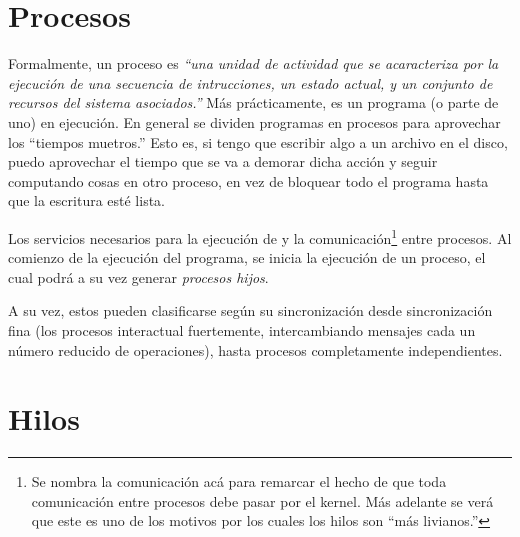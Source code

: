 \section{Procesos}
Formalmente, un proceso es \textit{``una unidad de actividad que se acaracteriza por la ejecución de una secuencia de intrucciones, un estado actual, y un conjunto de recursos del sistema asociados.''} Más prácticamente, es un programa (o parte de uno) en ejecución. En general se dividen programas en procesos para aprovechar los ``tiempos muetros.'' Esto es, si tengo que escribir algo a un archivo en el disco, puedo aprovechar el tiempo que se va a demorar dicha acción y seguir computando cosas en otro proceso, en vez de bloquear todo el programa hasta que la escritura esté lista.

Los servicios necesarios para la ejecución de y la comunicación\footnote{Se nombra la comunicación acá para remarcar el hecho de que toda comunicación entre procesos debe pasar por el kernel. Más adelante se verá que este es uno de los motivos por los cuales los hilos son ``más livianos.''} entre procesos. Al comienzo de la ejecución del programa, se inicia la ejecución de un proceso, el cual podrá a su vez generar \textit{procesos hijos}.

A su vez, estos pueden clasificarse según su sincronización desde sincronización fina (los procesos interactual fuertemente, intercambiando mensajes cada un número reducido de operaciones), hasta procesos completamente independientes.

\section{Hilos}

